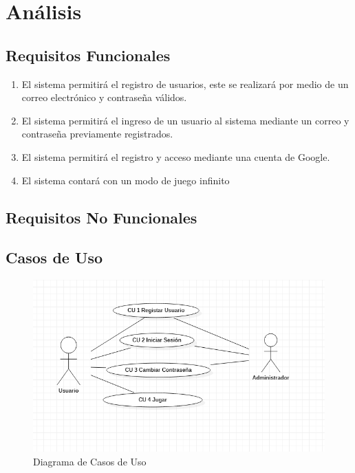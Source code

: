 \documentclass{article}
\begin{document}
\section{Análisis}
\subsection{Requisitos Funcionales}
\begin{enumerate}
\item {El sistema permitirá el registro de usuarios, este se realizará por medio de un correo electrónico y contraseña válidos.}
\item{El sistema permitirá el ingreso de un usuario al sistema mediante un correo y contraseña  previamente registrados.}
\item {El sistema permitirá el registro y acceso mediante una cuenta de Google.}
\item {El sistema contará con un modo de juego infinito}
\end{enumerate}
\subsection{Requisitos No Funcionales}
\subsection{Casos de Uso}
\begin{figure}[H]
    \centering
    \includegraphics[scale=0.7]{imgs/CasosDeUso}
    \caption{Diagrama de Casos de Uso}
\end{figure}
\end{document}

